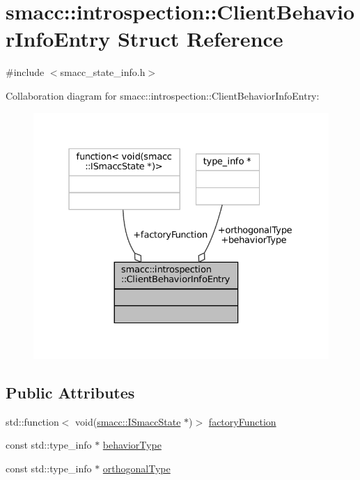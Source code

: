 \hypertarget{structsmacc_1_1introspection_1_1ClientBehaviorInfoEntry}{}\section{smacc\+:\+:introspection\+:\+:Client\+Behavior\+Info\+Entry Struct Reference}
\label{structsmacc_1_1introspection_1_1ClientBehaviorInfoEntry}


{\ttfamily \#include $<$smacc\+\_\+state\+\_\+info.\+h$>$}



Collaboration diagram for smacc\+:\+:introspection\+:\+:Client\+Behavior\+Info\+Entry\+:
\nopagebreak
\begin{figure}[H]
\begin{center}
\leavevmode
\includegraphics[width=331pt]{structsmacc_1_1introspection_1_1ClientBehaviorInfoEntry__coll__graph}
\end{center}
\end{figure}
\subsection*{Public Attributes}
\begin{DoxyCompactItemize}
\item 
std\+::function$<$ void(\hyperlink{classsmacc_1_1ISmaccState}{smacc\+::\+I\+Smacc\+State} $\ast$)$>$ \hyperlink{structsmacc_1_1introspection_1_1ClientBehaviorInfoEntry_abb0863623802e0107c659e61931518f4}{factory\+Function}
\item 
const std\+::type\+\_\+info $\ast$ \hyperlink{structsmacc_1_1introspection_1_1ClientBehaviorInfoEntry_a11156213a771b7801ae69698de326e44}{behavior\+Type}
\item 
const std\+::type\+\_\+info $\ast$ \hyperlink{structsmacc_1_1introspection_1_1ClientBehaviorInfoEntry_aabffb57e6ee723ce1b2bdb6ad30c6993}{orthogonal\+Type}
\end{DoxyCompactItemize}



